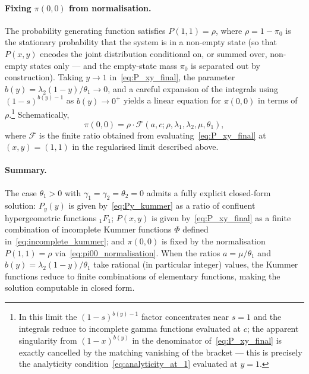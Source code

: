 \paragraph{Fixing $\pi(0,0)$ from normalisation.}
The probability generating function satisfies $P(1,1) = \rho$, where $\rho = 1 - \pi_0$ is the stationary probability that the system is in a non-empty state (so that $P(x,y)$ encodes the joint distribution conditional on, or summed over, non-empty states only — and the empty-state mass $\pi_0$ is separated out by construction). Taking $y \to 1$ in~\eqref{eq:P_xy_final}, the parameter $b(y) = \lambda_2(1-y)/\theta_1 \to 0$, and a careful expansion of the integrals using $(1-s)^{b(y)-1}$ as $b(y) \to 0^+$ yields a linear equation for $\pi(0,0)$ in terms of $\rho$.\footnote{In this limit the $(1-s)^{b(y)-1}$ factor concentrates near $s = 1$ and the integrals reduce to incomplete gamma functions evaluated at $c$; the apparent singularity from $(1-x)^{b(y)}$ in the denominator of~\eqref{eq:P_xy_final} is exactly cancelled by the matching vanishing of the bracket — this is precisely the analyticity condition~\eqref{eq:analyticity_at_1} evaluated at $y = 1$.} Schematically,
\begin{equation}
    \pi(0,0) = \rho \cdot \mathcal{F}(a, c; \rho, \lambda_1, \lambda_2, \mu, \theta_1),
    \label{eq:pi00_normalisation}
\end{equation}
where $\mathcal{F}$ is the finite ratio obtained from evaluating~\eqref{eq:P_xy_final} at $(x,y) = (1,1)$ in the regularised limit described above.

\paragraph{Summary.}
The case $\theta_1 > 0$ with $\gamma_1 = \gamma_2 = \theta_2 = 0$ admits a fully explicit closed-form solution: $P_y(y)$ is given by~\eqref{eq:Py_kummer} as a ratio of confluent hypergeometric functions ${}_1F_1$; $P(x,y)$ is given by~\eqref{eq:P_xy_final} as a finite combination of incomplete Kummer functions $\Phi$ defined in~\eqref{eq:incomplete_kummer}; and $\pi(0,0)$ is fixed by the normalisation $P(1,1) = \rho$ via~\eqref{eq:pi00_normalisation}. When the ratios $a = \mu/\theta_1$ and $b(y) = \lambda_2(1-y)/\theta_1$ take rational (in particular integer) values, the Kummer functions reduce to finite combinations of elementary functions, making the solution computable in closed form.



























